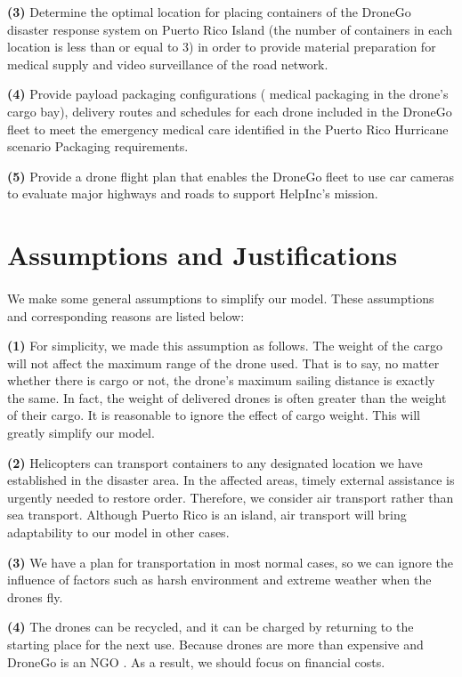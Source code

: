 \documentclass{article} %
\begin{document}
\textbf{(3)} Determine the optimal location for placing containers of the DroneGo disaster response system on Puerto Rico Island (the number of containers in each location is less than or equal to 3) in order to provide material preparation for medical supply and video surveillance of the road network.

\textbf{(4)} Provide payload packaging configurations ( medical packaging in the drone's cargo bay), delivery routes and schedules for each drone included in the DroneGo fleet to meet the emergency medical care identified in the Puerto Rico Hurricane scenario Packaging requirements.


\textbf{(5)} Provide a drone flight plan that enables the DroneGo fleet to use car cameras to evaluate major highways and roads to support HelpInc's mission.

\section{Assumptions and Justifications}  
 \paragraph{}We make some general assumptions to simplify our model. These assumptions and corresponding reasons are listed below:

\textbf{(1)} For simplicity, we made this assumption as follows. The weight of the cargo will not affect the maximum range of the drone used. That is to say, no matter whether there is cargo or not, the drone’s maximum sailing distance is exactly the same. In fact, the weight of delivered drones is often greater than the weight of their cargo. It is reasonable to ignore the effect of cargo weight. This will greatly simplify our model.

\textbf{(2)} Helicopters can transport containers to any designated location we have established in the disaster area. In the affected areas, timely external assistance is urgently needed to restore order. Therefore, we consider air transport rather than sea transport. Although Puerto Rico is an island, air transport will bring adaptability to our model in other cases.

\textbf{(3)} We have a plan for transportation in most normal cases, so we can ignore the influence of factors such as harsh environment and extreme weather when the drones fly.


\textbf{(4)} The drones can be recycled, and it can be charged by returning to the starting place for the next use. Because drones are more than expensive and DroneGo is an NGO . As a result, we should focus on financial costs.
\end{document}

